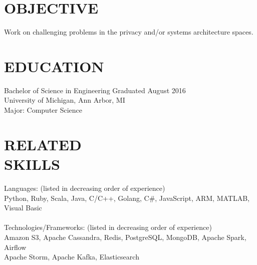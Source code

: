 \documentclass[line,margin]{res}
\begin{document}

\color{HeaderColor}
\address{\hfill riizade@gmail.com -- github.com/riizade -- 248-716-5054}

 
 \renewcommand{\labelitemi}{$-$}
 
\begin{resume}
\color{black}
\section{\textcolor{HeaderColor}{OBJECTIVE}}
				Work on challenging problems in the privacy and/or systems architecture spaces.

\section{\textcolor{HeaderColor}{EDUCATION}} {\sc Bachelor of Science in Engineering} \hfill Graduated August 2016\\
				University of Michigan, Ann Arbor, MI \\
                Major: Computer Science 
 
\section{\textcolor{HeaderColor}{RELATED \\ SKILLS}} 
				{\sc Languages: (listed in decreasing order of experience)} \\
				Python, Ruby, Scala, Java, C/C++, Golang, C\#, JavaScript, ARM, MATLAB, Visual Basic \\
\\
				{\sc Technologies/Frameworks: (listed in decreasing order of experience)} \\
				Amazon S3, Apache Cassandra, Redis, PostgreSQL, MongoDB, Apache Spark, Airflow \\ Apache Storm, Apache Kafka, Elasticsearch
 

\end{resume}
\end{document}
